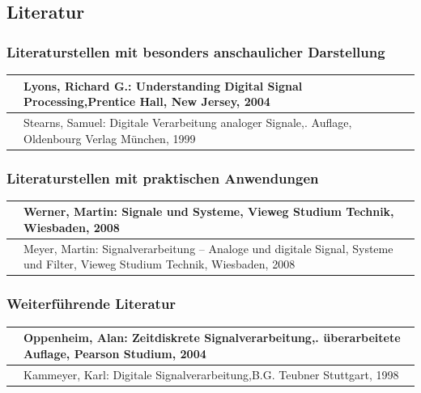 \subsection{Literatur}


\subsubsection{Literaturstellen mit besonders anschaulicher Darstellung}

\begin{tabular}{|p{0.8in}|p{5.7in}|} \hline 
[Lyon04] & Lyons, Richard G.: Understanding Digital Signal \newline Processing,Prentice Hall, New Jersey, 2004 \\ \hline 
[Stea99] & Stearns, Samuel: Digitale Verarbeitung analoger Signale,\newline 7. Auflage, Oldenbourg Verlag M\"{u}nchen, 1999 \\ \hline 
\end{tabular}


\subsubsection{Literaturstellen mit praktischen Anwendungen}

\begin{tabular}{|p{0.8in}|p{5.7in}|} \hline 
[Wern08] & Werner, Martin: Signale und Systeme,\newline
Vieweg Studium Technik, Wiesbaden, 2008 \\\hline 
[Meye08] & Meyer, Martin: Signalverarbeitung -- Analoge und digitale Signal, Systeme und Filter,\newline 
Vieweg Studium Technik, Wiesbaden, 2008 \\  \hline 
\end{tabular}


\subsubsection{ Weiterf\"{u}hrende Literatur}

\begin{tabular}{|p{0.8in}|p{3.7in}|} \hline 
[Oppe04] & Oppenheim, Alan: Zeitdiskrete Signalverarbeitung,\newline 2. \"{u}berarbeitete Auflage, Pearson Studium, 2004 \\ \hline 
[Kamm98] & Kammeyer, Karl: Digitale Signalverarbeitung,\newline B.G. Teubner Stuttgart, 1998 \\ \hline 
\end{tabular}

